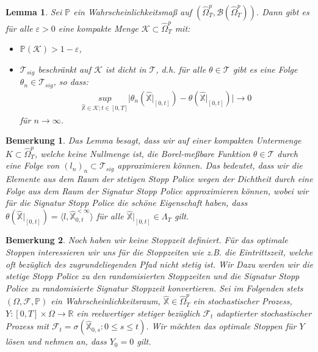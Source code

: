 \documentclass[12pt,titlepage,headsepline]{article}
\newtheorem{lemma}[theorem]{Lemma}
\newtheorem*{bemerkung*}{Bemerkung}
\begin{document}
      \begin{lemma}\label{lemma:dense}
        Sei $\mathbb{P}$ ein Wahrscheinlichkeitsmaß auf $(\hat{\Omega}_T^p,\mathcal{B}(\hat{\Omega}_T^p))$. Dann gibt es für alle $\varepsilon > 0$ eine kompakte Menge $\mathcal{K} \subset \hat{\Omega}_T^p$ mit:
        \begin{itemize}
          \item $\mathbb{P}(\mathcal{K}) > 1 - \varepsilon$,
          \item $\mathcal{T}_{sig}$ beschränkt auf $\mathcal{K}$ ist dicht in $\mathcal{T}$, d.h. für alle $\theta \in \mathcal{T}$ gibt es eine Folge $\theta_n \in \mathcal{T}_{sig}$, so dass:
          \begin{align*}
            \underset{\hat{\mathbb{X}} \in \mathcal{K}; t \in [0,T]}{sup} \lvert \theta_n(\hat{\mathbb{X}}\rvert_{[0,t]}) - \theta(\hat{\mathbb{X}}\rvert_{[0,t]}) \rvert \rightarrow 0
          \end{align*}
          für $n \rightarrow \infty$.
        \end{itemize}
      \end{lemma}
      \begin{bemerkung*}
        \textup{
        Das Lemma besagt, dass wir auf einer kompakten Untermenge $K \subset \hat{\Omega}_T^p $, welche keine Nullmenge ist, die Borel-meßbare Funktion $\theta \in \mathcal{T}$ durch eine Folge von $(l_n)_n \subset \mathcal{T}_{sig}$ approximieren können. Das bedeutet, dass wir die Elemente aus dem Raum der stetigen Stopp Police wegen der Dichtheit durch eine Folge aus dem Raum der Signatur Stopp Police approximieren können, wobei wir für die Signatur Stopp Police die schöne Eigenschaft haben, dass $\theta(\hat{\mathbb{X}}\rvert_{[0,t]})=\langle l, \hat{\mathbb{X}}^{<\infty}_{0,t} \rangle$ für alle
        $\hat{\mathbb{X}}\rvert_{[0,t]} \in \Lambda_T$ gilt.
        }
      \end{bemerkung*}
      \begin{bemerkung*}
        \textup{
        Noch haben wir keine Stoppzeit definiert. Für das optimale Stoppen interessieren wir uns für die Stoppzeiten wie z.B. die Eintrittszeit, welche oft bezüglich des zugrundeliegenden Pfad nicht stetig ist. Wir  Dazu werden wir die stetige Stopp Police zu den randomisierten Stoppzeiten und die Signatur Stopp Police zu randomisierte Signatur Stoppzeit konvertieren.
        \hfill\break
        Sei im Folgenden stets $(\Omega, \mathcal{F},\mathbb{P})$ ein Wahrscheinlichkeitsraum, $\hat{\mathbb{X}} \in \hat{\Omega}_T^p$ ein stochastischer Prozess, $Y: [0,T] \times \Omega \rightarrow \mathbb{R}$ ein reelwertiger stetiger bezüglich $\mathcal{F}_t$ adaptierter stochastischer Prozess mit
        $\mathcal{F}_t = \sigma(\hat{\mathbb{X}}_{0,s} : 0 \leq s \leq t)$. Wir möchten das optimale Stoppen für $Y$ lösen und nehmen an, dass $Y_0 = 0$ gilt.
        }
      \end{bemerkung*}
\end{document}

